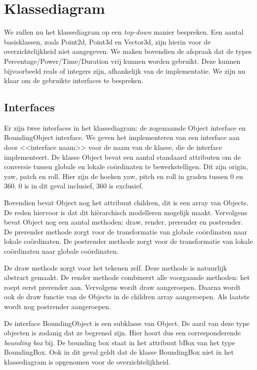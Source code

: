 \section{Klassediagram}

We zullen nu het klassediagram op een \emph{top-down} manier bespreken. Een aantal basisklassen, zoals Point2d, Point3d en Vector3d,  zijn hierin voor de overzichtelijkheid niet aangegeven. We maken bovendien de afspraak dat de types Percentage/Power/Time/Duration vrij kunnen worden gebruikt. Deze kunnen bijvoorbeeld reals of integers zijn, afhankelijk van de implementatie.  We zijn nu klaar om de gebruikte interfaces te bespreken.

\subsection{Interfaces}
Er zijn twee interfaces in het klassediagram: de zogenaamde Object interface en BoundingObject interface. We geven het implementeren van een interface aan door <<interface naam>> voor de naam van de klasse, die de interface implementeert.  De klasse Object bevat een aantal standaard attributen om de conversie tussen globale en lokale co\"ordinaten te bewerkstelligen. Dit zijn origin, yaw, patch en roll. Hier zijn de hoeken yaw, pitch en roll in graden tussen 0 en 360. 0 is in dit geval inclusief, 360 is exclusief. 

Bovendien bevat Object nog het attribuut children, dit is een array van Objects. De reden hiervoor is dat dit hi\"erarchisch modelleren mogelijk maakt. Vervolgens bevat Object nog een aantal methoden: draw, render, prerender en postrender. De prerender methode zorgt voor de transformatie van globale co\"ordinaten naar lokale co\"ordinaten. De postrender methode zorgt voor de transformatie van lokale co\"ordinaten naar globale co\"ordinaten. 

De draw methode zorgt voor het tekenen zelf. Deze methode is natuurlijk abstract gemaakt. De render methode combineert alle voorgaande methoden: het roept eerst prerender aan. Vervolgens wordt draw aangeroepen. Daarna wordt ook de draw functie van de Objects in de children array aangeroepen. Als laatste wordt nog postrender aangeroepen.

De interface BoundingObject is een subklasse van Object. De aard van deze type objecten is zodanig dat ze begrensd zijn. Hier hoort dus een corresponderende \emph{bounding box} bij. De bounding box staat in het attribuut bBox van het type BoundingBox. Ook in dit geval geldt dat de klasse BoundingBox niet in het klassediagram is opgenomen voor de overzichtelijkheid. 

